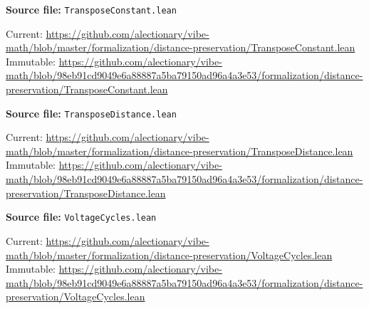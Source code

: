 \par\smallskip\noindent\begin{minipage}{\linewidth}\small\setlength{\baselineskip}{11pt}
\textbf{Source file:} \nolinkurl{TransposeConstant.lean}\par\nopagebreak
Current: \url{https://github.com/alectionary/vibe-math/blob/master/formalization/distance-preservation/TransposeConstant.lean}\\
Immutable: \url{https://github.com/alectionary/vibe-math/blob/98eb91cd9049e6a88887a5ba79150ad96a4a3e53/formalization/distance-preservation/TransposeConstant.lean}\par\end{minipage}\par
\par\smallskip\noindent\begin{minipage}{\linewidth}\small\setlength{\baselineskip}{11pt}
\textbf{Source file:} \nolinkurl{TransposeDistance.lean}\par\nopagebreak
Current: \url{https://github.com/alectionary/vibe-math/blob/master/formalization/distance-preservation/TransposeDistance.lean}\\
Immutable: \url{https://github.com/alectionary/vibe-math/blob/98eb91cd9049e6a88887a5ba79150ad96a4a3e53/formalization/distance-preservation/TransposeDistance.lean}\par\end{minipage}\par
\par\smallskip\noindent\begin{minipage}{\linewidth}\small\setlength{\baselineskip}{11pt}
\textbf{Source file:} \nolinkurl{VoltageCycles.lean}\par\nopagebreak
Current: \url{https://github.com/alectionary/vibe-math/blob/master/formalization/distance-preservation/VoltageCycles.lean}\\
Immutable: \url{https://github.com/alectionary/vibe-math/blob/98eb91cd9049e6a88887a5ba79150ad96a4a3e53/formalization/distance-preservation/VoltageCycles.lean}\par\end{minipage}\par
